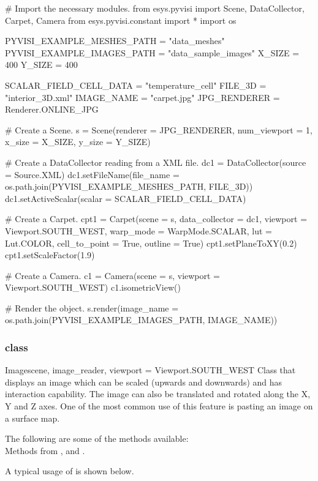 \begin{python}
# Import the necessary modules.
from esys.pyvisi import Scene, DataCollector, Carpet, Camera
from esys.pyvisi.constant import *
import os

PYVISI_EXAMPLE_MESHES_PATH = "data_meshes"
PYVISI_EXAMPLE_IMAGES_PATH = "data_sample_images"
X_SIZE = 400
Y_SIZE = 400

SCALAR_FIELD_CELL_DATA = "temperature_cell"
FILE_3D = "interior_3D.xml"
IMAGE_NAME = "carpet.jpg"
JPG_RENDERER = Renderer.ONLINE_JPG

# Create a Scene.
s = Scene(renderer = JPG_RENDERER, num_viewport = 1, x_size = X_SIZE, 
        y_size = Y_SIZE)

# Create a DataCollector reading from a XML file.
dc1 = DataCollector(source = Source.XML)
dc1.setFileName(file_name = os.path.join(PYVISI_EXAMPLE_MESHES_PATH, FILE_3D))
dc1.setActiveScalar(scalar = SCALAR_FIELD_CELL_DATA)

# Create a Carpet.
cpt1 = Carpet(scene = s, data_collector = dc1, viewport = Viewport.SOUTH_WEST, 
        warp_mode = WarpMode.SCALAR, lut = Lut.COLOR, cell_to_point = True,
        outline = True)
cpt1.setPlaneToXY(0.2)
cpt1.setScaleFactor(1.9)

# Create a Camera.
c1 = Camera(scene = s, viewport = Viewport.SOUTH_WEST)
c1.isometricView()

# Render the object.
s.render(image_name = os.path.join(PYVISI_EXAMPLE_IMAGES_PATH, IMAGE_NAME))
\end{python}

\subsubsection{\Image class}

\begin{classdesc}{Image}{scene, image_reader, viewport = Viewport.SOUTH_WEST}
Class that displays an image which can be scaled (upwards and downwards) and
has interaction capability. The image can also be translated and rotated along 
the X, Y and Z axes. One of the most common use of this feature is pasting an 
image on a surface map.
\end{classdesc}

The following are some of the methods available:\\
Methods from \ActorThreeD, \PlaneSource and \Transform.

A typical usage of \Image is shown below.

